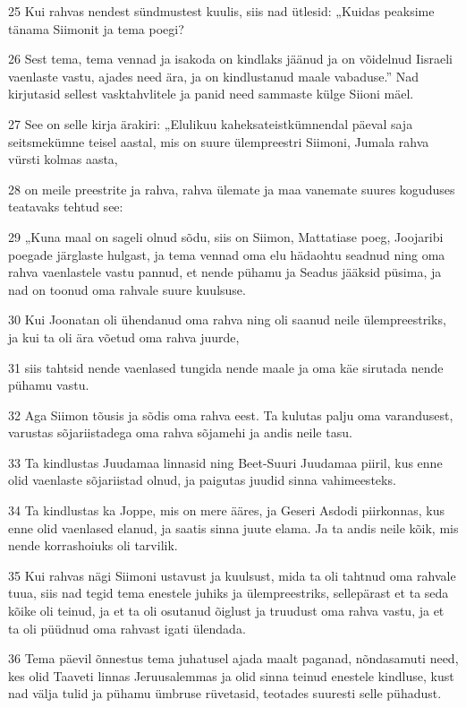 \par 25 Kui rahvas nendest sündmustest kuulis, siis nad ütlesid: „Kuidas peaksime tänama Siimonit ja tema poegi?
\par 26 Sest tema, tema vennad ja isakoda on kindlaks jäänud ja on võidelnud Iisraeli vaenlaste vastu, ajades need ära, ja on kindlustanud maale vabaduse.” Nad kirjutasid sellest vasktahvlitele ja panid need sammaste külge Siioni mäel.
\par 27 See on selle kirja ärakiri: „Elulikuu kaheksateistkümnendal päeval saja seitsmekümne teisel aastal, mis on suure ülempreestri Siimoni, Jumala rahva vürsti kolmas aasta,
\par 28 on meile preestrite ja rahva, rahva ülemate ja maa vanemate suures koguduses teatavaks tehtud see:
\par 29 „Kuna maal on sageli olnud sõdu, siis on Siimon, Mattatiase poeg, Joojaribi poegade järglaste hulgast, ja tema vennad oma elu hädaohtu seadnud ning oma rahva vaenlastele vastu pannud, et nende pühamu ja Seadus jääksid püsima, ja nad on toonud oma rahvale suure kuulsuse.
\par 30 Kui Joonatan oli ühendanud oma rahva ning oli saanud neile ülempreestriks, ja kui ta oli ära võetud oma rahva juurde,
\par 31 siis tahtsid nende vaenlased tungida nende maale ja oma käe sirutada nende pühamu vastu.
\par 32 Aga Siimon tõusis ja sõdis oma rahva eest. Ta kulutas palju oma varandusest, varustas sõjariistadega oma rahva sõjamehi ja andis neile tasu.
\par 33 Ta kindlustas Juudamaa linnasid ning Beet-Suuri Juudamaa piiril, kus enne olid vaenlaste sõjariistad olnud, ja paigutas juudid sinna vahimeesteks.
\par 34 Ta kindlustas ka Joppe, mis on mere ääres, ja Geseri Asdodi piirkonnas, kus enne olid vaenlased elanud, ja saatis sinna juute elama. Ja ta andis neile kõik, mis nende korrashoiuks oli tarvilik.
\par 35 Kui rahvas nägi Siimoni ustavust ja kuulsust, mida ta oli tahtnud oma rahvale tuua, siis nad tegid tema enestele juhiks ja ülempreestriks, sellepärast et ta seda kõike oli teinud, ja et ta oli osutanud õiglust ja truudust oma rahva vastu, ja et ta oli püüdnud oma rahvast igati ülendada.
\par 36 Tema päevil õnnestus tema juhatusel ajada maalt paganad, nõndasamuti need, kes olid Taaveti linnas Jeruusalemmas ja olid sinna teinud enestele kindluse, kust nad välja tulid ja pühamu ümbruse rüvetasid, teotades suuresti selle pühadust.
